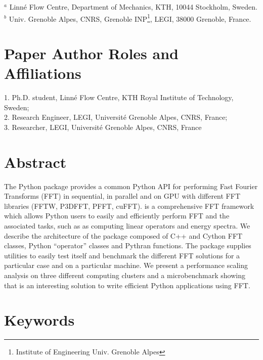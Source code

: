 $^a$ Linn\'e Flow Centre, Department of Mechanics, KTH, 10044 Stockholm, Sweden.
$^b$ Univ. Grenoble Alpes, CNRS, Grenoble INP\footnote{Institute of Engineering
Univ. Grenoble Alpes}, LEGI, 38000 Grenoble, France.\\

\section{Paper Author Roles and Affiliations}

1. Ph.D. student, Linn\'e Flow Centre, KTH Royal Institute of Technology,
Sweden; \\
2. Research Engineer, LEGI, Universit\'e Grenoble Alpes, CNRS, France; \\
3. Researcher, LEGI, Universit\'e Grenoble Alpes, CNRS, France

\section{Abstract}


The Python package  provides a common Python API for performing
Fast Fourier Transforms (FFT) in sequential, in parallel and on GPU with different
FFT libraries (FFTW, P3DFFT, PFFT, cuFFT).  is a comprehensive FFT
framework which allows Python users to easily and efficiently perform FFT and the
associated tasks, such as as computing linear operators and energy spectra.
%
We describe the architecture of the package composed of C++ and Cython FFT
classes, Python ``operator'' classes and Pythran functions.
%
The package supplies utilities to easily test itself and benchmark the different
FFT solutions for a particular case and on a particular machine.
%
We present a performance scaling analysis on three different computing clusters
and a microbenchmark showing that  is an interesting solution to
write efficient Python applications using FFT.

\section{Keywords}

